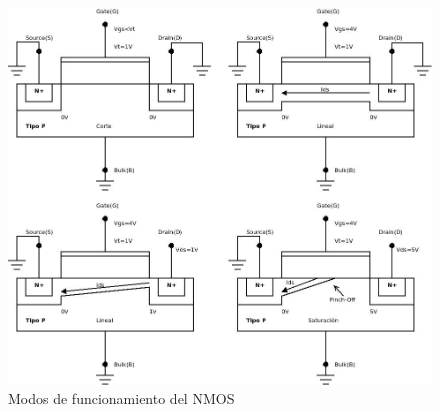 \documentclass[oneside]{book}
\numberwithin{equation}{section}
\numberwithin{figure}{section}
\numberwithin{table}{section}
\begin{document}
				\begin{figure}[H]
					\begin{center}
						\includegraphics[scale=0.45]{N-MOS-modos.jpeg}
						\caption{Modos de funcionamiento del NMOS}
					\end{center}
				\end{figure}	
				
\end{document}

